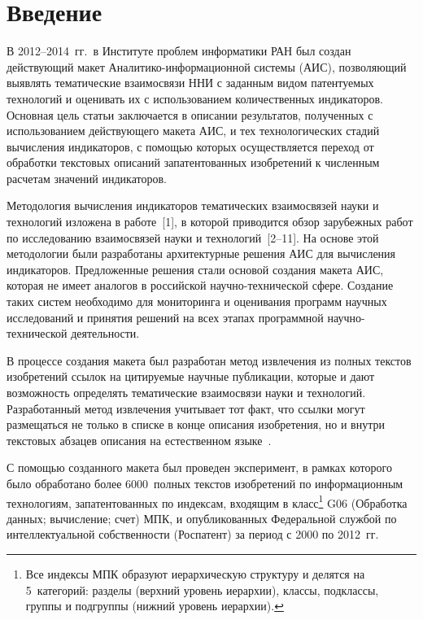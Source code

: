 

      \thispagestyle{headings}

      \begin{multicols}{2}

            \label{st\stat}

\section{Введение}

     В 2012--2014~гг.\ в Институте проблем информатики РАН был создан действующий макет
     Ана\-ли\-ти\-ко-ин\-фор\-ма\-ци\-он\-ной сис\-те\-мы (АИС), позволяющий
     выявлять тематические взаимосвязи ННИ с заданным видом патентуемых технологий
     и оце\-нивать их с  использованием количественных
ин\-дикаторов. Основная цель статьи заключается в описании результатов,
полученных с использованием действующего макета
АИС, и тех технологических стадий вычисления индикаторов, с по\-мощью которых осуществляется переход от
обработки текс\-то\-вых описаний запатентованных изобретений к численным расчетам значений индикаторов.

     Методология вычисления индикаторов тематических взаимосвязей науки и технологий изложена в работе~[1], в
которой приводится обзор зарубежных работ по исследованию взаимосвязей науки и технологий~[2--11]. На основе этой
методологии были разработаны архитектурные решения АИС для вычисления индикаторов. Предложенные решения
стали основой создания макета АИС, которая не имеет аналогов в российской на\-уч\-но-тех\-ни\-че\-ской сфере.
Создание таких систем необходимо для мониторинга и оценивания программ научных исследований и принятия
решений на всех этапах программной
     на\-уч\-но-тех\-ни\-че\-ской деятельности.

     В процессе создания макета был разработан метод извлечения из полных текстов изобретений ссылок на
цитируемые научные публикации, которые и дают возможность определять тематические взаимосвязи науки и
технологий. Разработанный метод извлечения учитывает тот факт, что ссылки могут размещаться не только в списке в
конце описания изобретения, но и внутри текстовых абзацев описания на естественном языке~\cite{12-zat}.

     С помощью созданного макета был проведен эксперимент, в рамках которого было обработано более
     6000~пол\-ных текстов изобретений по информационным технологиям, запатентованных по индексам, входящим в
     \label{snoska}
класс\footnote[5]{Все индексы МПК
образуют иерархическую структуру и делятся на 5~категорий: разделы (верхний уровень иерархии),
классы, подклассы, группы и подгруппы (нижний уровень иерархии).} G06 (Обработка данных; вычисление; счет)
МПК, и опубликованных Федеральной службой по интеллектуальной
соб\-ствен\-ности (Роспатент) за период с 2000 по 2012~гг.


\end{multicols}
